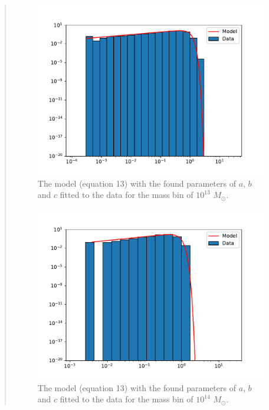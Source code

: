 \begin{quote}
\begin{figure}[!h]
\end{figure}

\begin{figure}[!ht]
\centering
\includegraphics[scale=0.7]{plots/satgals_m13.pdf}
\caption{The model (equation 13) with the found parameters of $a$, $b$ and $c$ fitted to the data for the mass bin of $10^{13}$ $M_{\odot}$.}
\end{figure}
\newpage
\begin{figure}[!hb]
\centering
\includegraphics[scale=0.7]{plots/satgals_m14.pdf}
\caption{The model (equation 13) with the found parameters of $a$, $b$ and $c$ fitted to the data for the mass bin of $10^{14}$ $M_{\odot}$.}
\end{figure}



\end{quote}
